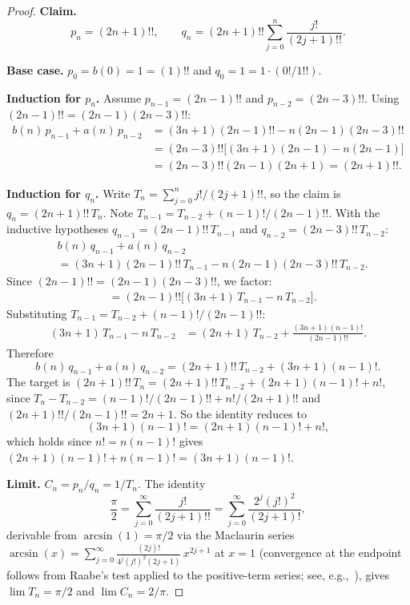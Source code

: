\documentclass[11pt,a4paper]{article}
\theoremstyle{plain}
\theoremstyle{remark}
\begin{document}
\begin{proof}
\textbf{Claim.}
\begin{equation}\label{eq:pi-pq}
  p_n = (2n{+}1)!!, \qquad
  q_n = (2n{+}1)!! \sum_{j=0}^{n} \frac{j!}{(2j{+}1)!!}.
\end{equation}

\textbf{Base case.} $p_0 = b(0) = 1 = (1)!!$ and $q_0 = 1 = 1\cdot(0!/1!!)$.

\medskip\noindent\textbf{Induction for $p_n$.}
Assume $p_{n-1} = (2n{-}1)!!$ and $p_{n-2} = (2n{-}3)!!$.
Using $(2n{-}1)!! = (2n{-}1)(2n{-}3)!!$:
\begin{align*}
  b(n)\,p_{n-1} + a(n)\,p_{n-2}
  &= (3n{+}1)(2n{-}1)!! - n(2n{-}1)(2n{-}3)!! \\
  &= (2n{-}3)!!\bigl[(3n{+}1)(2n{-}1) - n(2n{-}1)\bigr] \\
  &= (2n{-}3)!!(2n{-}1)(2n{+}1) = (2n{+}1)!!.
\end{align*}

\medskip\noindent\textbf{Induction for $q_n$.}
Write $T_n = \sum_{j=0}^{n} j!/(2j{+}1)!!$, so the claim is
$q_n = (2n{+}1)!!\,T_n$.
Note $T_{n-1} = T_{n-2} + (n{-}1)!/(2n{-}1)!!$.
With the inductive hypotheses
$q_{n-1} = (2n{-}1)!!\,T_{n-1}$ and $q_{n-2} = (2n{-}3)!!\,T_{n-2}$:
\begin{align*}
&b(n)\,q_{n-1} + a(n)\,q_{n-2} \\
&= (3n{+}1)(2n{-}1)!!\,T_{n-1}
   - n(2n{-}1)(2n{-}3)!!\,T_{n-2}.
\end{align*}
Since $(2n{-}1)!! = (2n{-}1)(2n{-}3)!!$, we factor:
\begin{align*}
&= (2n{-}1)!!\bigl[(3n{+}1)\,T_{n-1} - n\,T_{n-2}\bigr].
\end{align*}
Substituting $T_{n-1} = T_{n-2} + (n{-}1)!/(2n{-}1)!!$:
\begin{align*}
(3n{+}1)\,T_{n-1} - n\,T_{n-2}
&= (2n{+}1)\,T_{n-2} + \frac{(3n{+}1)(n{-}1)!}{(2n{-}1)!!}.
\end{align*}
Therefore
\[
b(n)\,q_{n-1} + a(n)\,q_{n-2}
= (2n{+}1)!!\,T_{n-2} + (3n{+}1)(n{-}1)!.
\]
The target is
$(2n{+}1)!!\,T_n = (2n{+}1)!!\,T_{n-2} + (2n{+}1)(n{-}1)! + n!$,
since $T_n - T_{n-2} = (n{-}1)!/(2n{-}1)!! + n!/(2n{+}1)!!$
and $(2n{+}1)!!/(2n{-}1)!! = 2n{+}1$.
So the identity reduces to
\[
(3n{+}1)(n{-}1)! = (2n{+}1)(n{-}1)! + n!,
\]
which holds since $n! = n(n{-}1)!$ gives
$(2n{+}1)(n{-}1)! + n(n{-}1)! = (3n{+}1)(n{-}1)!$.

\medskip\noindent\textbf{Limit.}
$C_n = p_n/q_n = 1/T_n$.
The identity~\cite[Chapter~5]{cuyt2008}
\begin{equation}\label{eq:pi-id}
  \frac{\pi}{2}
  = \sum_{j=0}^{\infty} \frac{j!}{(2j{+}1)!!}
  = \sum_{j=0}^{\infty} \frac{2^j(j!)^2}{(2j{+}1)!},
\end{equation}
derivable from $\arcsin(1) = \pi/2$ via the Maclaurin series
$\arcsin(x) = \sum_{j=0}^\infty \frac{(2j)!}{4^j(j!)^2(2j{+}1)}\,x^{2j+1}$
at $x = 1$ (convergence at the endpoint follows from Raabe's test
applied to the positive-term series;
see, e.g.,~\cite[\S5.2]{cuyt2008}),
gives $\lim T_n = \pi/2$ and $\lim C_n = 2/\pi$.
\end{proof}
\end{document}
